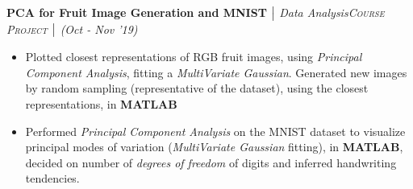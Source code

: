 \documentclass{article}
\begin{document}
\vspace{-5pt}
\textbf{PCA for Fruit Image Generation and MNIST} $\bigm|$ {\it Data Analysis}\hfill{\sl \small \textsc{Course Project} $\bigm|$ (Oct - Nov '19)}\\
\vspace{-18.5pt}
\begin{itemize}[itemsep = -1.25 mm, leftmargin=*]
   \item Plotted closest representations of RGB fruit images, using \textit{Principal Component Analysis}, fitting a \textit{MultiVariate Gaussian}.\vspace{-0.25mm} Generated new images by random sampling (representative of the dataset), using the closest representations, in \textbf{MATLAB}
    \item Performed \textit{Principal Component Analysis} on the MNIST dataset to visualize principal modes of variation (\textit {MultiVariate\vspace{-0.25mm} Gaussian} fitting), in \textbf{MATLAB}, decided on number of \textit{degrees of freedom} of digits and inferred handwriting tendencies.
\end{itemize}
\end{document}
